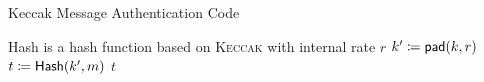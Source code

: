 \begin{algorithm}[t]
\caption{Keccak Message Authentication Code}
\label{alg:kmac}
\begin{algorithmic}[1]
\Require \textsf{Hash} is a hash function based on \textsc{Keccak} with internal rate $r$
    \State $k' \coloneqq{} \textsf{pad}(k, r)$
    \State $t \coloneqq{} \textsf{Hash}(k', m)$
    \State \Return $t$
\EndProcedure
\end{algorithmic}
\end{algorithm}
